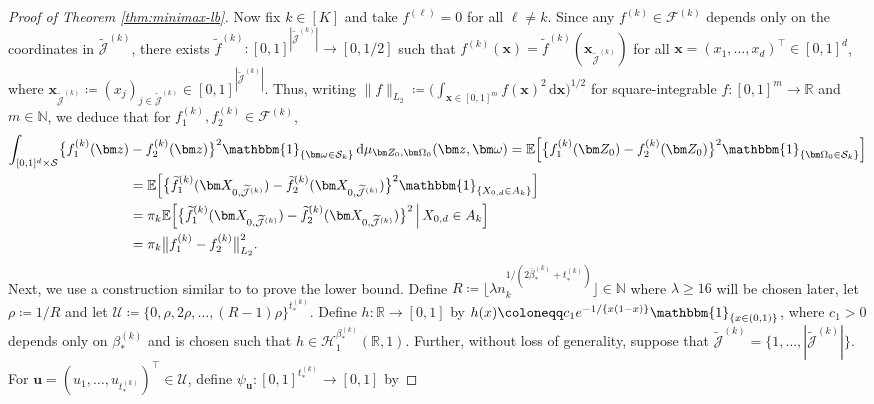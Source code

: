 \documentclass[12pt]{article}
\def\tilde{\widetilde}
\begin{document}
\begin{proof}[Proof of Theorem \ref{thm:minimax-lb}]
    Now fix $k\in[K]$ and take $f^{(\ell)} = 0$ for all $\ell \neq k$. 
    Since any $f^{(k)} \in \mathcal{F}^{(k)}$ depends only on the coordinates in $\tilde{\mathcal{J}}^{(k)}$, there exists $\tilde{f}^{(k)}: [0,1]^{|\tilde{\mathcal{J}}^{(k)}|} \to [0, 1/2]$ such that $f^{(k)}(\bm x) = \tilde{f}^{(k)}(\bm x_{\tilde{\mathcal{J}}^{(k)}})$ for all $\bm x = (x_1,\ldots,x_d)^\top \in[0,1]^d$, where $\bm x_{\tilde{\mathcal{J}}^{(k)}} \coloneqq (x_j)_{j \in \tilde{\mathcal{J}}^{(k)}} \in [0,1]^{|\tilde{\mathcal{J}}^{(k)}|}$. Thus, writing $\|f\|_{L_2} \coloneqq \bigl(\int_{\bm x \in [0,1]^m} f(\bm x)^2 \,\mathrm{d}\bm x\bigr)^{1/2}$ for square-integrable $f:[0,1]^m \to \mathbb{R}$ and $m\in\mathbb{N}$, we deduce that for $f_1^{(k)}, f_2^{(k)} \in \mathcal{F}^{(k)}$,
    \begin{align}
        \int_{[0,1]^d \times \mathcal{S}} \bigl\{f^{(k)}_1(\bm z) &- f^{(k)}_2(\bm z) \bigr\}^2\mathbbm{1}_{\{\bm\omega\in\mathcal{S}_k\}} \, \mathrm{d}\mu_{\bm Z_0,\bm\Omega_0}(\bm z, \bm \omega) = \mathbb{E} \Bigl[ \bigl\{f^{(k)}_1(\bm Z_0) - f^{(k)}_2(\bm Z_0)\bigr\}^2 \mathbbm{1}_{\{\bm\Omega_0 \in \mathcal{S}_k\}} \Bigr]\nonumber\\
        &= \mathbb{E} \Bigl[ \bigl\{\tilde{f}^{(k)}_1(\bm X_{0,\tilde{\mathcal{J}}^{(k)}}) - \tilde{f}^{(k)}_2(\bm X_{0,\tilde{\mathcal{J}}^{(k)}})\bigr\}^2 \mathbbm{1}_{\{X_{0,d} \in A_k\}} \Bigr]\nonumber\\
        &= \pi_k \mathbb{E} \Bigl[ \bigl\{\tilde{f}^{(k)}_1(\bm X_{0,\tilde{\mathcal{J}}^{(k)}}) - \tilde{f}^{(k)}_2(\bm X_{0,\tilde{\mathcal{J}}^{(k)}})\bigr\}^2 \,\Big|\, X_{0,d} \in A_k \Bigr] \nonumber\\
        &= \pi_k \bigl\| f^{(k)}_1 - f^{(k)}_2 \bigr\|_{L_2}^2. \label{eq:mu-Z-Omega-norm-bound}
    \end{align}
    Next, we use a construction similar to \citet[Theorem~3]{schmidt-hieber2020nonparametric} to prove the lower bound.  Define $R \coloneqq \lfloor \lambda n_k^{1/(2\bar\beta_*^{(k)} + t_*^{(k)})} \rfloor \in \mathbb{N}$ where $\lambda \geq 16$ will be chosen later, let $\rho\coloneqq 1/R$ and let $\mathcal{U} \coloneqq \{0,\rho,2\rho,\ldots,(R-1)\rho\}^{t_*^{(k)}}$.  Define $h: \mathbb{R} \rightarrow [0,1]$ by $h(x) \coloneqq c_1e^{-1/\{x(1-x)\}}\mathbbm{1}_{\{x\in(0,1)\}}$, where $c_1 > 0$ depends only on $\beta^{(k)}_*$ and is chosen such that $h \in \mathcal{H}_1^{\beta^{(k)}_*}(\mathbb{R},1)$.  Further, without loss of generality, suppose that $\tilde{\mathcal{J}}^{(k)} = \{1,\ldots,|\tilde{\mathcal{J}}^{(k)}|\}$. For $\bm u = (u_1,\ldots,u_{t_*^{(k)}})^\top \in \mathcal{U}$, define $\psi_{\bm u} : [0,1]^{t_*^{(k)}} \to [0,1]$ by

\end{proof}
\end{document}
